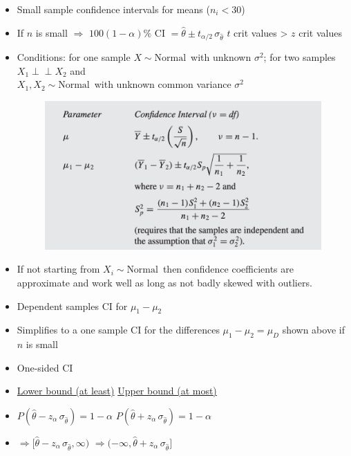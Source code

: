 \documentclass{article}
\newcommand{\ind}{\perp \!\!\! \perp}			%
\newcommand{\follow}[1]{\sim \text{#1}\,}		%
\begin{document}
\begin{itemize}
    \item Small sample confidence intervals for means ($n_i < 30$)
    \item[] If $n$ is small $\Longrightarrow$ $100 (1 - \alpha)\% \text{ CI } = \hat{\theta} \pm t_{\alpha / 2} \, \sigma_{\hat{\theta}}$ \hspace{100pt} $t$ crit values > $z$ crit values
    \item[] Conditions: for one sample $X \follow{Normal}$ with unknown $\sigma^2$; for two samples $X_1 \ind X_2$ and \\ $X_1, X_2 \follow{Normal}$ with unknown common variance $\sigma^2$
    \begin{figure}[H]
        \center\includegraphics[scale=0.5]{images/small-n-ci.png}
    \end{figure}
    \item[] If not starting from $X_i \follow{Normal}$ then confidence coefficients are approximate and work well as long as not badly skewed with outliers.
    \item Dependent samples CI for $\mu_1 - \mu_2$
    \item[] Simplifies to a one sample CI for the differences $\mu_1 - \mu_ 2 = \mu_D$ shown above if $n$ is small\bigskip
    \item One-sided CI
    \item[] \ul{Lower bound (at least)} \hspace{200pt} \ul{Upper bound (at most)}
    \item[] $P(\hat{\theta} - z_\alpha \, \sigma_{\hat{\theta}}) = 1 - \alpha$  \hspace{150pt} $P(\hat{\theta} + z_\alpha \, \sigma_{\hat{\theta}}) = 1 - \alpha$
    \item[] $\Longrightarrow [\hat{\theta} - z_\alpha \, \sigma_{\hat{\theta}}, \infty)$ \hspace{170pt} $\Longrightarrow (-\infty, \hat{\theta} + z_\alpha \, \sigma_{\hat{\theta}}]$
\end{itemize}\bigskip
\end{document}
